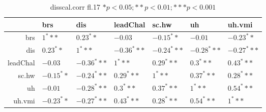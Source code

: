 \begin{table}[ht]
\centering
\begin{tabular}{rllllll}
  \hline
 & brs & dis & leadChal & sc.hw & uh & uh.vmi \\ 
  \hline
brs & $1^***$ & $0.23^**$ & $-0.03$ & $-0.15^**$ & $-0.01$ & $-0.23^**$ \\ 
  dis & $0.23^**$ & $1^***$ & $-0.36^***$ & $-0.24^***$ & $-0.28^***$ & $-0.27^***$ \\ 
  leadChal & $-0.03$ & $-0.36^***$ & $1^***$ & $0.29^***$ & $0.3^***$ & $0.43^***$ \\ 
  sc.hw & $-0.15^**$ & $-0.24^***$ & $0.29^***$ & $1^***$ & $0.37^***$ & $0.28^***$ \\ 
  uh & $-0.01$ & $-0.28^***$ & $0.3^***$ & $0.37^***$ & $1^***$ & $0.54^***$ \\ 
  uh.vmi & $-0.23^**$ & $-0.27^***$ & $0.43^***$ & $0.28^***$ & $0.54^***$ & $1^***$ \\ 
   \hline
\end{tabular}
\caption{disscal.corr fl.17 $* p < 0.05; ** p < 0.01; *** p < 0.001$} 
\end{table}
